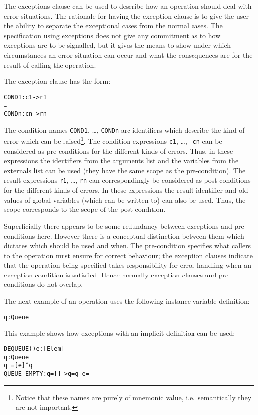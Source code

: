\documentclass[\pformat,12pt]{article}
\begin{document}
\begin{description}
The exceptions clause can be used to describe how an operation should
deal with error situations. The rationale for having the exception
clause is to give the user the ability to separate the exceptional
cases from the normal cases. The specification using exceptions does
not give any commitment as to how exceptions are to be signalled, but
it gives the means to show under which circumstances an error
situation can occur and what the consequences are for the result of
calling the operation.

The exception clause has the form:
\begin{alltt}
    COND1: c1 -> r1
       \ldots
       CONDn: cn -> rn
\end{alltt}
The condition names {\tt COND1}, \ldots, {\tt CONDn} are identifiers
which describe the kind of error which can be raised\footnote{Notice
that these names are purely of mnemonic value, i.e.\ semantically they
are not important.}. The condition expressions {\tt c1}, \ldots, {\tt
cn} can be considered as pre-conditions for the different kinds of
errors. Thus, in these expressions the identifiers from the arguments
list and the variables from the externals list can be used (they have
the same scope as the pre-condition). The result expressions {\tt r1},
\ldots, {\tt rn} can correspondingly be considered as post-conditions
for the different kinds of errors. In these expressions the result
identifier and old values of global variables (which can be written
to) can also be used. Thus, the scope corresponds to the scope of the
post-condition.

Superficially there appears to be some redundancy between exceptions
and pre-conditions here. However there is a conceptual distinction
between them which dictates which should be used and when. The
pre-condition specifies what callers  to the operation must ensure for
correct behaviour; the exception clauses indicate that the operation
being specified takes responsibility for error handling when an
exception condition is satisfied. Hence normally exception clauses and
pre-conditions do not overlap.

The next example of an operation uses the following instance variable definition:
\begin{alltt}
    q : Queue
\end{alltt}    
This example shows how exceptions with an implicit definition can be used:
\begin{alltt}
  DEQUEUE() e: [Elem]
    q : Queue
   q~ = [e] ^ q
   QUEUE_EMPTY: q = [] -> q = q~  e = 
\end{alltt}


\end{description}
\end{document}
